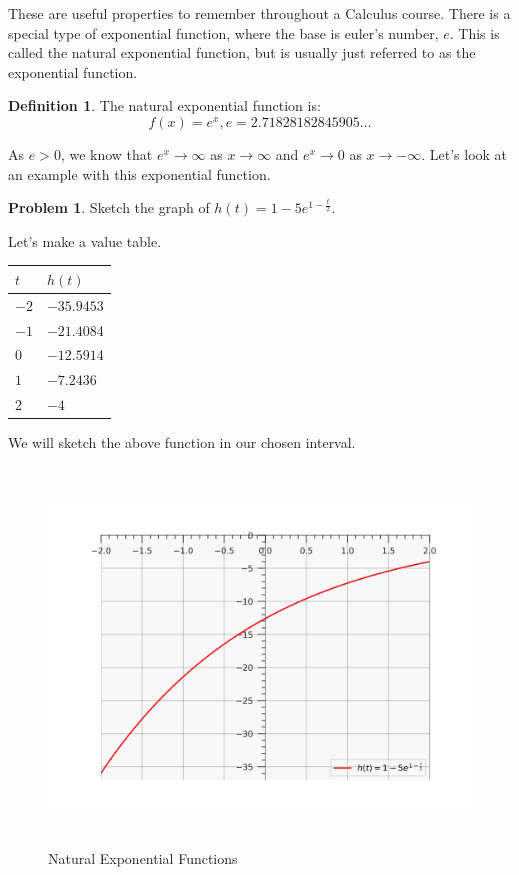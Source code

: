 \documentclass[12pt]{article}
\theoremstyle{definition}
\newtheorem{problem}{Problem}
\newtheorem{definition}{Definition}
\begin{document}
These are useful properties to remember throughout a Calculus course.
There is a special type of exponential function, where the base is euler's number, $e$.
This is called the natural exponential function, but is usually just referred to as the exponential function.

\begin{definition}
    The natural exponential function is:
    \begin{equation*}
        f(x) = e^x, e=2.71828182845905 \dots
    \end{equation*}
\end{definition}

As $e>0$, we know that $e^x \rightarrow \infty$ as $x \rightarrow \infty$ and $e^x \rightarrow 0$ as $x \rightarrow -\infty$.
Let's look at an example with this exponential function.

\begin{problem}
Sketch the graph of $h(t) = 1 - 5e^{1-\frac{t}{2}}$.
\end{problem}

Let's make a value table.

\begin{table}[H]
    \renewcommand{\arraystretch}{1.5}
    \centering
    \begin{tabular}{>{\centering\arraybackslash}m{1cm}|>{\centering\arraybackslash}m{2cm}}
        $t$  & $h(t)$     \\ \hline
        $-2$ & $-35.9453$ \\
        $-1$ & $-21.4084$ \\
        $0$  & $-12.5914$ \\
        $1$  & $	-7.2436$ \\
        $2$  & $	-4$
    \end{tabular}
\end{table}

We will sketch the above function in our chosen interval.

\begin{figure}[H]
    \centering
    \includegraphics[width=12.5cm, height=10cm]{exponential_functions_2.png}
    \caption{Natural Exponential Functions}
    \label{fig:fig2}
\end{figure}
\end{document}
